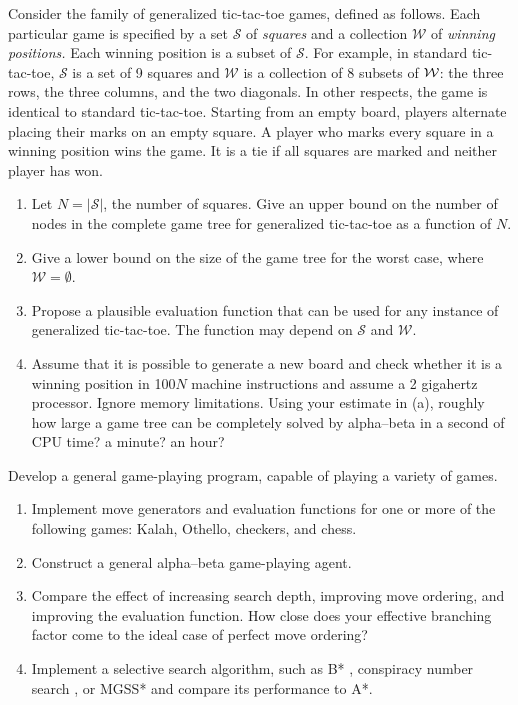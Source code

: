 \begin{exercise}
Consider the family of generalized tic-tac-toe games, defined as follows.
Each particular game is specified by a set \(\mathcal S\) of {\em
squares\/} and a collection \(\mathcal W\) of {\em winning positions.} Each 
winning position is a subset of \(\mathcal S\). For example, in 
standard tic-tac-toe,
\(\mathcal S\) is a set of 9 squares and \(\mathcal W\) is a collection
of 8 subsets of \(\cal W\): the three rows, the three columns, and the two 
diagonals. In other respects, the game is identical to standard
tic-tac-toe. Starting from an empty board, players alternate placing
their marks on an empty square.  A player who marks every square in a
winning position wins the game. It is a tie if all squares are marked
and neither player has won.
\begin{enumerate}
\item Let \(N= |{\mathcal S}|\), the number of squares.
Give an upper bound on the number of 
nodes in the complete game tree for generalized tic-tac-toe
as a function of \(N\).
\item  Give a lower bound on the size of the game tree
for the worst case, where \({\mathcal W} = \emptyset\).
\item
Propose a plausible evaluation function that can be used for any instance
of generalized tic-tac-toe. The function may depend on \(\mathcal S\) and
\(\mathcal W\).
\item
Assume that it is possible to generate a new board and check whether
it is a winning position in 100\(N\) machine
instructions and assume a 2 gigahertz processor. Ignore memory limitations.
Using your estimate in (a), 
roughly how large a game tree can be completely solved by alpha--beta in a second of CPU
time? a minute? an hour?
\end{enumerate}
\end{exercise} 

\begin{exercise}\prgex
Develop a general game-playing program, capable of playing a variety of games.
\begin{enumerate}
\item Implement move generators and evaluation functions for one or more of
the following games: Kalah, Othello, checkers, and chess.  
\item Construct a
general alpha--beta game-playing agent.
\item Compare the effect of increasing search depth,
improving move ordering, and improving the evaluation function. How
close does your effective branching factor come to the ideal case of
perfect move ordering?
\item Implement a selective search algorithm, such as B* \cite{Berliner:1979},
conspiracy number search \cite{McAllester:1988}, or MGSS* \cite{Russell+Wefald:1989}
and compare its performance to A*.
\end{enumerate}
\end{exercise} 

